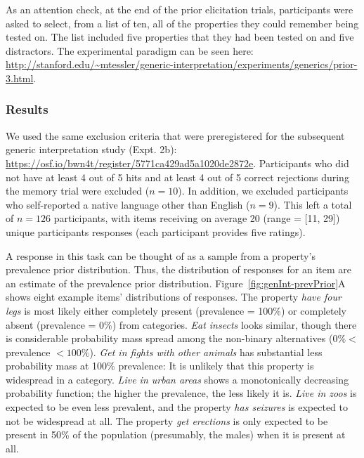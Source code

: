 \documentclass[floatsintext,man]{apa6}
\theoremstyle{definition}
\theoremstyle{definition}
\theoremstyle{definition}
\theoremstyle{remark}
\begin{document}
As an attention check, at the end of the prior elicitation trials,
participants were asked to select, from a list of ten, all of the
properties they could remember being tested on. The list included five
properties that they had been tested on and five distractors. The
experimental paradigm can be seen here:
\url{http://stanford.edu/~mtessler/generic-interpretation/experiments/generics/prior-3.html}.

\subsubsection{Results}\label{results-1}

We used the same exclusion criteria that were preregistered for the
subsequent generic interpretation study (Expt. 2b):
\url{https://osf.io/bwn4t/register/5771ca429ad5a1020de2872e}.
Participants who did not have at least 4 out of 5 hits and at least 4
out of 5 correct rejections during the memory trial were excluded
(\(n = 10\)). In addition, we excluded participants who self-reported a
native language other than English (\(n = 9\)). This left a total of
\(n = 126\) participants, with items receiving on average 20 (range =
{[}11, 29{]}) unique participants responses (each participant provides
five ratings).

A response in this task can be thought of as a sample from a property's
prevalence prior distribution. Thus, the distribution of responses for
an item are an estimate of the prevalence prior distribution.
Figure~\ref{fig:genInt-prevPrior}A shows eight example items'
distributions of responses. The property \emph{have four legs} is most
likely either completely present (prevalence = 100\%) or completely
absent (prevalence = 0\%) from categories. \emph{Eat insects} looks
similar, though there is considerable probability mass spread among the
non-binary alternatives (\(0\% <\) prevalence \(< 100\%\)). \emph{Get in
fights with other animals} has substantial less probability mass at
100\% prevalence: It is unlikely that this property is widespread in a
category. \emph{Live in urban areas} shows a monotonically decreasing
probability function; the higher the prevalence, the less likely it is.
\emph{Live in zoos} is expected to be even less prevalent, and the
property \emph{has seizures} is expected to not be widespread at all.
The property \emph{get erections} is only expected to be present in 50\%
of the population (presumably, the males) when it is present at all.
\end{document}
